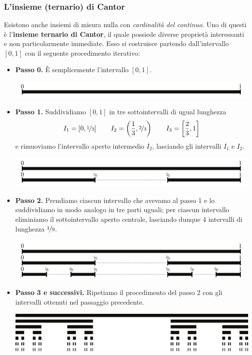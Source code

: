 \subsubsection{L'insieme (ternario) di Cantor}\label{insiemecantor}
Esistono anche insiemi di misura nulla con \textit{cardinalità del continuo}. Uno di questi è l'\textbf{insieme ternario di Cantor}, il quale possiede diverse proprietà interessanti e non particolarmente immediate. Esso si costruisce partendo dall'intervallo $\left[0,1\right]$ con il seguente procedimento iterativo:
\begin{itemize}
	\item \textbf{Passo 0.} È semplicemente l'intervallo $\left[0,1\right]$.
	\begin{center}
		\includegraphics[trim=0cm 0cm 0cm 0cm, clip, scale=0.5]{images/Cantor0.pdf}
	\end{center}
	\item \textbf{Passo 1.} Suddividiamo $\left[0,1\right]$ in tre sottointervalli di ugual lunghezza
	\begin{equation*}
		I_1=\left[0,\nicefrac{1}{3}\right]\qquad I_2=\left(\frac{1}{3},\nicefrac{2}{3}\right)\qquad I_3=\left[\frac{2}{3},1\right]
	\end{equation*}
	e rimuoviamo l'intervallo aperto intermedio $I_2$, lasciando gli intervalli $I_1$ e $I_2$.
	\begin{center}
		\includegraphics[trim=0cm 0cm 0cm 0cm, clip, scale=0.5]{images/Cantor1.pdf}
	\end{center}
	\item \textbf{Passo 2.} Prendiamo ciascun intervallo che avevamo al passo 1 e lo suddividiamo in modo analogo in tre parti uguali; per ciascun intervallo eliminiamo il sottointervallo aperto centrale, lasciando dunque 4 intervalli di lunghezza $\nicefrac{1}{9}$.
	\begin{center}
		\includegraphics[trim=0cm 0cm 0cm 0cm, clip, scale=0.5]{images/Cantor2.pdf}
	\end{center}
	\item \textbf{Passo 3 e successivi.} Ripetiamo il procedimento del passo 2 con gli intervalli ottenuti nel passaggio precedente.
\begin{center}
	\includegraphics[trim=0cm 0cm 0cm 0cm, clip, scale=0.5]{images/Cantor3.pdf}
\end{center}
\end{itemize}
